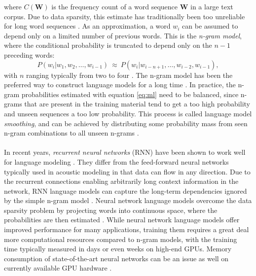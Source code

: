 \documentclass[english, 12pt, a4paper, pdftex, elec, utf8]{aaltothesis}
\begin{document}
where $C(\bm{W})$ is the frequency count of a word sequence $\bm{W}$ in a large text corpus. Due to data sparsity, this estimate has traditionally been too unreliable for long word sequences \cite{gales2008application}. As an approximation, a word $w_i$ can be assumed to depend only on a limited number of previous words. This is the \textit{n-gram model}, where the conditional probability is truncated to depend only on the $n-1$ preceding words:
\begin{equation}
P(w_i|w_1,w_2,\dots,w_{i-1}) \ \approx \ P(w_i|w_{i-n+1},\dots,w_{i-2},w_{i-1}),
\end{equation}
with $n$ ranging typically from two to four \cite[p.~210]{gales2008application}. The n-gram model has been the preferred way to construct language models for a long time \cite{gales2008application, kallasjoki2016, hirsimaki2009importance}. In practice, the n-gram probabilities estimated with equation \ref{eq:ml} need to be balanced, since n-grams that are present in the training material tend to get a too high probability and unseen sequences a too low probability. This process is called language model \textit{smoothing}, and can be achieved by distributing some probability mass from seen n-gram combinations to all unseen n-grams \cite{gales2008application}. \\\\
In recent years, \textit{recurrent neural networks} (RNN) have been shown to work well for language modeling \cite{enarvi2017automatic}. They differ from the feed-forward neural networks typically used in acoustic modeling in that data can flow in any direction. Due to the recurrent connections enabling arbitrarily long context information in the network, RNN language models can capture the long-term dependencies ignored by the simple n-gram model \cite{enarvi2017automatic, mansikkaniemi2017continuous}. Neural network language models overcome the data sparsity problem by projecting words into continuous space, where the probabilities are then estimated \cite{mansikkaniemi2017continuous}. While neural network language models offer improved performance for many applications, training them requires a great deal more computational resources compared to n-gram models, with the training time typically measured in days or even weeks on high-end GPUs. Memory consumption of state-of-the-art neural networks can be an issue as well on currently available GPU hardware \cite{enarvi2017automatic}. \\\\
\end{document}
